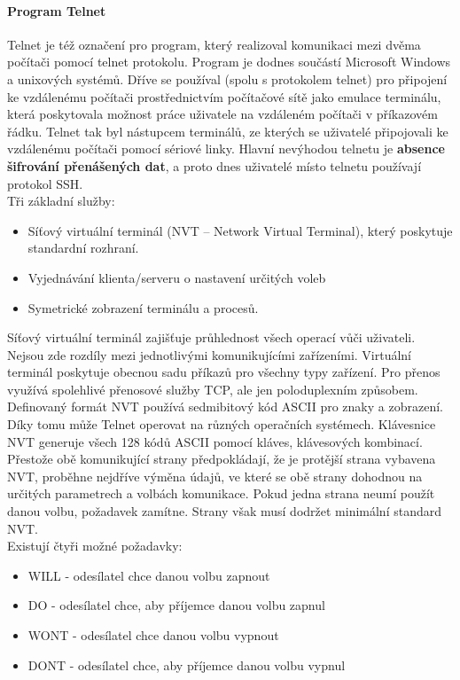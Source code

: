 \documentclass[10pt,a4paper]{article}
\begin{document}
\paragraph{Program Telnet} Telnet je též označení pro program, který realizoval komunikaci mezi dvěma počítači pomocí telnet protokolu. Program je dodnes součástí Microsoft Windows a unixových systémů. Dříve se používal (spolu s protokolem telnet) pro připojení ke vzdálenému počítači prostřednictvím počítačové sítě jako emulace terminálu, která poskytovala možnost práce uživatele na vzdáleném počítači v příkazovém řádku. Telnet tak byl nástupcem terminálů, ze kterých se uživatelé připojovali ke vzdálenému počítači pomocí sériové linky. Hlavní nevýhodou telnetu je \textbf{absence šifrování přenášených dat}, a proto dnes uživatelé místo telnetu používají protokol SSH. \\
Tři základní služby:
\begin{itemize}
	\item Síťový virtuální terminál (NVT – Network Virtual Terminal), který poskytuje standardní rozhraní.
	\item Vyjednávání klienta/serveru o nastavení určitých voleb
	\item Symetrické zobrazení terminálu a procesů.
\end{itemize}
Síťový virtuální terminál zajišťuje průhlednost všech operací vůči uživateli. Nejsou zde rozdíly mezi jednotlivými komunikujícími zařízeními. Virtuální terminál poskytuje obecnou sadu příkazů pro všechny typy zařízení. Pro přenos využívá spolehlivé přenosové služby TCP, ale jen poloduplexním způsobem. Definovaný formát NVT používá sedmibitový kód ASCII pro znaky a zobrazení. Díky tomu může Telnet operovat na různých operačních systémech. Klávesnice NVT generuje všech 128 kódů ASCII pomocí kláves, klávesových kombinací. \\
Přestože obě komunikující strany předpokládají, že je protější strana vybavena NVT, proběhne nejdříve výměna údajů, ve které se obě strany dohodnou na určitých parametrech a volbách komunikace. Pokud jedna strana neumí použít danou volbu, požadavek zamítne. Strany však musí dodržet minimální standard NVT. \\
Existují čtyři možné požadavky:
\begin{itemize}
	\item WILL - odesílatel chce danou volbu zapnout
	\item DO - odesílatel chce, aby příjemce danou volbu zapnul
	\item WONT - odesílatel chce danou volbu vypnout
	\item DONT - odesílatel chce, aby příjemce danou volbu vypnul
\end{itemize}
\end{document}
